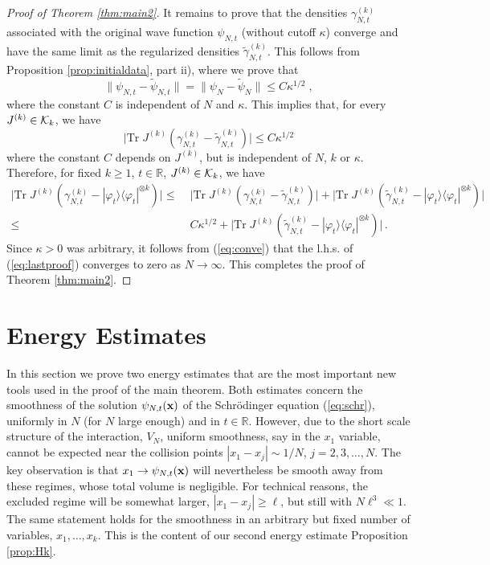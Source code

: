 \documentclass[11pt]{article}
\newcommand{\bx}{{\bf x}}
\newcommand{\ph}{\varphi}
\newcommand{\bR}{{\mathbb R}}
\newcommand{\tr}{\mbox{Tr}}
\newcommand{\wt}{\widetilde}
\newcommand{\cK}{{\cal K}}
\begin{document}
\begin{proof}[Proof of Theorem \ref{thm:main2}]
It remains to prove that the densities $\gamma^{(k)}_{N,t}$
associated with the original wave function $\psi_{N,t}$ (without
cutoff $\kappa$) converge and have the same limit as the regularized
densities $\wt \gamma^{(k)}_{N,t}$. This follows from Proposition
\ref{prop:initialdata}, part ii), where we prove that
\[
\| \psi_{N,t} - \wt\psi_{N,t} \| = \| \psi_{N} -
\wt\psi_{N} \| \leq C \kappa^{1/2} \; ,
\]
 where the constant
$C$ is independent of $N$ and $\kappa$. This implies that, for every
$J^{(k)} \in \cK_k$, we have
\begin{equation}\label{eq:remove}
\Big| \tr \; J^{(k)} \left( \gamma^{(k)}_{N,t} - \wt
\gamma^{(k)}_{N,t} \right) \Big| \leq C \kappa^{1/2}
\end{equation}
where the constant $C$ depends on $J^{(k)}$, but is independent of
$N$,  $k$ or $\kappa$. Therefore, for fixed $k \geq 1$, $t \in \bR$,
$J^{(k)} \in \cK_k$,  we have
\begin{equation}\label{eq:lastproof}
\begin{split}
\Big| \tr \; J^{(k)} \left( \gamma^{(k)}_{N,t} - |\ph_t \rangle
\langle \ph_t |^{\otimes k} \right) \Big| \leq &\; \Big| \tr \;
J^{(k)} \left( \gamma^{(k)}_{N,t} - \wt \gamma^{(k)}_{N,t} \right)
\Big| + \Big| \tr \; J^{(k)} \left( \wt \gamma^{(k)}_{N,t} - |\ph_t
\rangle \langle \ph_t |^{\otimes k} \right) \Big| \\
\leq & \; C \kappa^{1/2} + \Big| \tr \; J^{(k)} \left( \wt
\gamma^{(k)}_{N,t} - |\ph_t \rangle \langle \ph_t |^{\otimes k}
\right) \Big| \, .
\end{split}
\end{equation}
Since $\kappa >0$ was arbitrary, it follows from (\ref{eq:conve})
that the l.h.s. of (\ref{eq:lastproof}) converges to zero as $N \to
\infty$. This completes the proof of Theorem \ref{thm:main2}.
\end{proof}







\section{Energy Estimates}\label{sec:energy}
\setcounter{equation}{0}

In this section we prove two energy estimates that are the most
important new tools used in the proof of the main theorem. Both
estimates concern the smoothness of the solution $\psi_{N,t}(\bx)$
of the Schr\"odinger equation (\ref{eq:schr}),
 uniformly in $N$ (for $N$
large enough) and in $t \in \bR$. However, due to the short
scale structure of the interaction, $V_N$, uniform smoothness, say
in the $x_1$ variable, cannot be expected near the collision points
$|x_1-x_j|\sim 1/N$, $j=2, 3,  \ldots , N$.
 The key observation is that $x_1\to \psi_{N,t}(\bx)$ will
nevertheless be smooth away from these regimes, whose total volume
is negligible. For technical reasons, the excluded regime will be
somewhat larger, $|x_1-x_j|\ge \ell$, but still with $N\ell^3\ll 1$.
The same statement holds for the smoothness in an arbitrary but
fixed number of variables, $x_1, \ldots, x_k$. This is the content
of our second energy estimate Proposition \ref{prop:Hk}.
\end{document}
